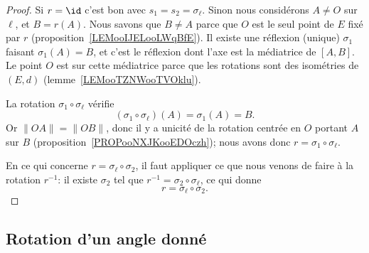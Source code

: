 \begin{proof}
    Si \( r=\id\) c'est bon avec \( s_1=s_2=\sigma_{\ell}\). Sinon nous considérons \( A\neq O\) sur \( \ell\), et \( B=r(A)\). Nous savons que \( B\neq A\) parce que \( O\) est le seul point de \( E\) fixé par \( r\) (proposition~\ref{LEMooIJELooLWqBfE}). Il existe une réflexion (unique) \( \sigma_1\) faisant \( \sigma_1(A)=B\), et c'est le réflexion dont l'axe est la médiatrice de \( [A,B]\). Le point \( O\) est sur cette médiatrice parce que les rotations sont des isométries de \( (E,d)\) (lemme~\ref{LEMooTZNWooTVOklu}).

    La rotation \( \sigma_1\circ \sigma_{\ell}\) vérifie
    \begin{equation}
        (\sigma_1\circ\sigma_{\ell})(A)=\sigma_1(A)=B.
    \end{equation}
    Or \( \| OA \|=\| OB \|\), donc il y a unicité de la rotation centrée en \( O\) portant \( A\) sur \( B\) (proposition~\ref{PROPooNXJKooEDOczh}); nous avons donc \( r=\sigma_1\circ\sigma_{\ell}\).

    En ce qui concerne \( r=\sigma_{\ell}\circ\sigma_2\), il faut appliquer ce que nous venons de faire à la rotation \( r^{-1}\): il existe \( \sigma_2\) tel que \( r^{-1}=\sigma_2\circ\sigma_{\ell}\), ce qui donne
    \begin{equation}
        r=\sigma_{\ell}\circ\sigma_2.
    \end{equation}
\end{proof}

\subsection{Rotation d'un angle donné}

